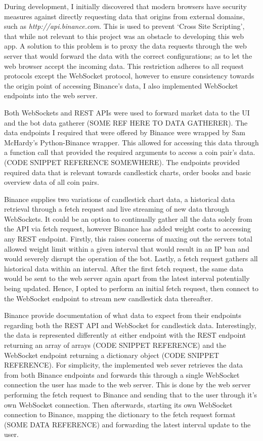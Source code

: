 \noindent During development, I initially discovered that modern browsers have security measures against directly requesting data that origins from external domains, such as \textit{http://api.binance.com}. This is used to prevent `Cross Site Scripting', that while not relevant to this project was an obstacle to developing this web app. A solution to this problem is to proxy the data requests through the web server that would forward the data with the correct configurations; as to let the web browser accept the incoming data. This restriction adheres to all request protocols except the WebSocket protocol, however to ensure consistency towards the origin point of accessing Binance's data, I also implemented WebSocket endpoints into the web server.

Both WebSockets and REST APIs were used to forward market data to the UI and the bot data gatherer (SOME REF HERE TO DATA GATHERER). The data endpoints I required that were offered by Binance were wrapped by Sam McHardy's \cite{MISC:Python-Binance} Python-Binance wrapper. This allowed for accessing this data through a function call that provided the required arguments to access a coin pair's data. (CODE SNIPPET REFERENCE SOMEWHERE).  The endpoints provided required data that is relevant towards candlestick charts, order books and basic overview data of all coin pairs.

Binance supplies two variations of candlestick chart data, a historical data retrieval through a fetch request and live streaming of new data through WebSockets. It could be an option to continually gather all the data solely from the API via fetch request, however Binance has added weight costs to accessing any REST endpoint. Firstly, this raises concerns of maxing out the servers total allowed weight limit within a given interval that would result in an IP ban and would severely disrupt the operation of the bot. Lastly, a fetch request gathers all historical data within an interval. After the first fetch request, the same data would be sent to the web server again apart from the latest interval potentially being updated. Hence, I opted to perform an initial fetch request, then connect to the WebSocket endpoint to stream new candlestick data thereafter. 

Binance provide documentation of what data to expect from their endpoints regarding both the REST API and WebSocket for candlestick data. Interestingly, the data is represented differently at either endpoint with the REST endpoint returning an array of arrays (CODE SNIPPET REFERENCE) and the WebSocket endpoint returning a dictionary object (CODE SNIPPET REFERENCE). For simplicity, the implemented web sever retrieves the data from both Binance endpoints and forwards this through a single WebSocket connection the user has made to the web server. This is done by the web server performing the fetch request to Binance and sending that to the user through it's own WebSocket connection. Then afterwards, starting its own WebSocket connection to Binance, mapping the dictionary to the fetch request format (SOME DATA REFERENCE) and forwarding the latest interval update to the user.

